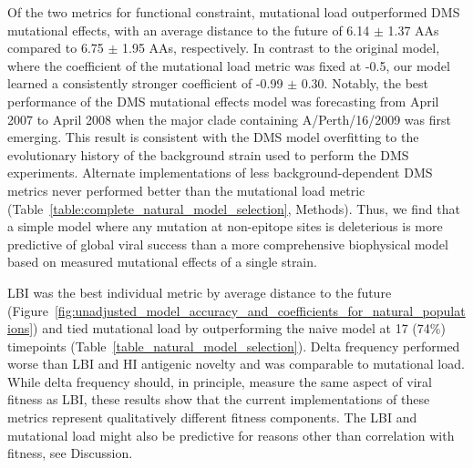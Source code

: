 Of the two metrics for functional constraint, mutational load outperformed DMS mutational effects, with an average distance to the future of 6.14 $\pm$ 1.37 AAs compared to 6.75 $\pm$ 1.95 AAs, respectively.
In contrast to the original \cite{Luksza:2014hj} model, where the coefficient of the mutational load metric was fixed at -0.5, our model learned a consistently stronger coefficient of -0.99 $\pm$ 0.30.
Notably, the best performance of the DMS mutational effects model was forecasting from April 2007 to April 2008 when the major clade containing A/Perth/16/2009 was first emerging.
This result is consistent with the DMS model overfitting to the evolutionary history of the background strain used to perform the DMS experiments.
Alternate implementations of less background-dependent DMS metrics never performed better than the mutational load metric (Table~\ref{table:complete_natural_model_selection}, Methods).
Thus, we find that a simple model where any mutation at non-epitope sites is deleterious is more predictive of global viral success than a more comprehensive biophysical model based on measured mutational effects of a single strain.

LBI was the best individual metric by average distance to the future (Figure~\ref{fig:unadjusted_model_accuracy_and_coefficients_for_natural_populations}) and tied mutational load by outperforming the naive model at 17 (74\%) timepoints (Table~\ref{table_natural_model_selection}).
Delta frequency performed worse than LBI and HI antigenic novelty and was comparable to mutational load.
While delta frequency should, in principle, measure the same aspect of viral fitness as LBI, these results show that the current implementations of these metrics represent qualitatively different fitness components.
The LBI and mutational load might also be predictive for reasons other than correlation with fitness, see Discussion.

